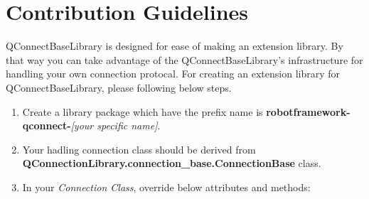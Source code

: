\hypertarget{description-contribution-guidelines}{%
\section{Contribution Guidelines}\label{description-contribution-guidelines}}

QConnectBaseLibrary is designed for ease of making an extension library.
By that way you can take advantage of the QConnectBaseLibrary's
infrastructure for handling your own connection protocal. For creating
an extension library for QConnectBaseLibrary, please following below
steps.

\begin{enumerate}
\def\labelenumi{\arabic{enumi}.}
\tightlist
\item
  Create a library package which have the prefix name is
  \textbf{robotframework-qconnect-}\emph{{[}your specific name{]}}.
\item
  Your hadling connection class should be derived from
  \textbf{QConnectionLibrary.connection\_base.ConnectionBase} class.
\item
  In your \emph{Connection Class}, override below attributes and
  methods:
\end{enumerate}

